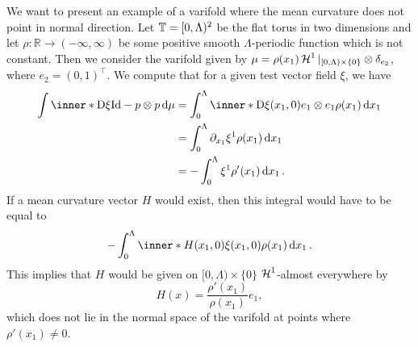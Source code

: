 \begin{example}
	\label{mean_curvature_vector_does_not_have_to_point_in_normal_direction}
	We want to present an example of a varifold where the mean curvature does 
	not point in normal direction.
	Let $ \operatorname{\mathbb{T}} = [ 0 , \Lambda )^{ 2 } $ be the flat torus in two 
	dimensions and let $ \rho \colon \mathbb{ R } \to (-\infty, \infty ) $ be 
	some positive smooth $\Lambda$-periodic function which is not constant. 
	Then we consider the varifold given by $ \mu = \rho ( x_{ 1 } ) \operatorname{\mathcal{H}}^{ 1 } 
	|_{ [ 0 , \Lambda ) \times \{ 0 \} } \otimes \delta_{ e_{ 2 } } $, where $ 
	e_{ 2 } = ( 0 , 1 )^{ \top } $. We 
	compute that for a given test vector field $ \xi $, we have
	\begin{align*}
		\int
		\inner*{ \diff \xi }{ \mathrm{Id} - p \otimes p }
		\dd{ \mu }
		& =
		\int_{ 0 }^{ \Lambda }
		\inner*{ \diff \xi ( x_{ 1 } , 0 ) }{ e_{ 1 } \otimes e_{ 1 } }
		\rho ( x_{ 1 } )
		\dd{ x_{ 1 } }
		\\
		& = 
		\int_{ 0 }^{ \Lambda }
		\partial_{ x_{ 1 } } \xi^{ 1 } \rho ( x_{ 1 } )
		\dd{ x_{ 1 } }
		\\
		& =
		-
		\int_{ 0 }^{ \Lambda }
		\xi^{ 1 }
		\rho' ( x_{ 1 } )
		\dd{ x_{ 1 } }.
	\end{align*}
	If a mean curvature vector $ H $ would exist, then this integral would have 
	to be equal to
	\begin{equation*}
		-\int_{ 0 }^{ \Lambda }
			\inner*{ H ( x_{ 1 } , 0 ) }{ \xi ( x_{ 1 } , 0 )  }
			\rho ( x_{ 1 } )
		\dd{ x_{ 1 } }.
	\end{equation*}
	This implies that $ H $ would be given on $ [ 0 , \Lambda ) \times \{ 0 \} 
	$ $ 
	\operatorname{\mathcal{H}}^{ 1 } $-almost everywhere by 
	\begin{equation*}
		H ( x ) = \frac{ \rho' ( x_{ 1 } ) }{ \rho ( x_{ 1 } ) } e_{ 1 },
	\end{equation*}
	which does not lie in the normal space of the varifold at points where $ 
	\rho ' ( x_{ 1 } ) \neq 0 $.
\end{example}